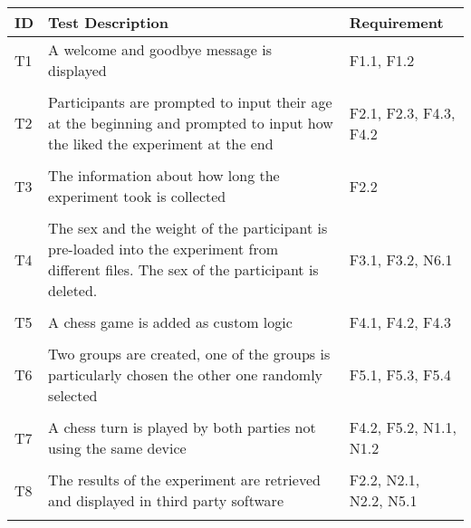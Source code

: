 \begin{table}[htbp]
    \centering
    \small
    \begin{tabular}{L{0.04\textwidth}L{0.7\textwidth}L{0.15\textwidth}}
    \hline
    ID  & Test Description                                                                                                                                     & Requirement                  \\ \hline
    T1  & A welcome and goodbye message is displayed                                                                                               & F1.1, F1.2                 \\
    & \\
    T2  & Participants are prompted to input their age at the beginning and prompted to input how the liked the experiment at the end              & F2.1, F2.3, F4.3, F4.2 \\
    & \\
    T3  & The information about how long the experiment took is collected                                                                          & F2.2                         \\
    & \\
    T4  & The sex and the weight of the participant is pre-loaded into the experiment from different files. The sex of the participant is deleted. & F3.1, F3.2, N6.1                         \\
    & \\
    T5  & A chess game is added as custom logic                                                                                                    &  F4.1, F4.2, F4.3         \\
    & \\
    T6  & Two groups are created, one of the groups is particularly chosen the other one randomly selected                                           & F5.1, F5.3, F5.4         \\
    & \\
    T7  & A chess turn is played by both parties not using the same device                                                                         & F4.2, F5.2, N1.1, N1.2         \\
    & \\
    T8  & The results of the experiment are retrieved and displayed in third party software                                                        & F2.2, N2.1, N2.2, N5.1                \\
    & \\

\end{tabular}
\end{table}
